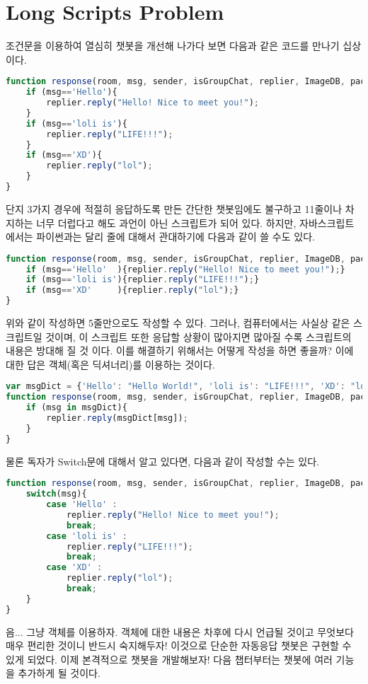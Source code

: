 \documentclass[10pt,a4paper,final]{book}
\begin{document}
\section{Long Scripts Problem}
조건문을 이용하여 열심히 챗봇을 개선해 나가다 보면 다음과 같은 코드를 만나기 십상이다.
\begin{lstlisting}[language=JavaScript,escapeinside=~~]
function response(room, msg, sender, isGroupChat, replier, ImageDB, packageName, threadId){
    if (msg=='Hello'){
        replier.reply("Hello! Nice to meet you!");
    }
    if (msg=='loli is'){
        replier.reply("LIFE!!!");
    }
    if (msg=='XD'){
        replier.reply("lol");
    }
}
\end{lstlisting}
단지 3가지 경우에 적절히 응답하도록 만든 간단한 챗봇임에도 불구하고 11줄이나 차지하는
너무 더럽다고 해도 과언이 아닌 스크립트가 되어 있다. 하지만, 자바스크립트에서는 파이썬과는 달리
줄에 대해서 관대하기에 다음과 같이 쓸 수도 있다.
\begin{lstlisting}[language=JavaScript,escapeinside=~~]
function response(room, msg, sender, isGroupChat, replier, ImageDB, packageName, threadId){
    if (msg=='Hello'  ){replier.reply("Hello! Nice to meet you!");}
    if (msg=='loli is'){replier.reply("LIFE!!!");}
    if (msg=='XD'     ){replier.reply("lol");}
}
\end{lstlisting}
위와 같이 작성하면 5줄만으로도 작성할 수 있다. 그러나, 컴퓨터에서는 사실상 같은 스크립트일 것이며, 이 스크립트 또한
응답할 상황이 많아지면 많아질 수록 스크립트의 내용은 방대해 질 것 이다. 이를 해결하기 위해서는
어떻게 작성을 하면 좋을까? 이에 대한 답은 객체(혹은 딕셔너리)를 이용하는 것이다.
\begin{lstlisting}[language=JavaScript,escapeinside=~~]
var msgDict = {'Hello': "Hello World!", 'loli is': "LIFE!!!", 'XD': "lol"};
function response(room, msg, sender, isGroupChat, replier, ImageDB, packageName, threadId){
    if (msg in msgDict){
        replier.reply(msgDict[msg]);
    }
}
\end{lstlisting}
물론 독자가 Switch문에 대해서 알고 있다면, 다음과 같이 작성할 수는 있다.
\begin{lstlisting}[language=JavaScript,escapeinside=~~]
function response(room, msg, sender, isGroupChat, replier, ImageDB, packageName, threadId){
    switch(msg){
        case 'Hello' :
            replier.reply("Hello! Nice to meet you!");
            break;
        case 'loli is' :
            replier.reply("LIFE!!!");
            break;
        case 'XD' :
            replier.reply("lol");
            break;
    }
}
\end{lstlisting}
음... 그냥 객체를 이용하자.
객체에 대한 내용은 차후에 다시 언급될 것이고 무엇보다 매우 편리한 것이니 반드시 숙지해두자!
이것으로 단순한 자동응답 챗봇은 구현할 수 있게 되었다.
이제 본격적으로 챗봇을 개발해보자! 다음 챕터부터는 챗봇에 여러 기능을 추가하게 될 것이다.
\end{document}
